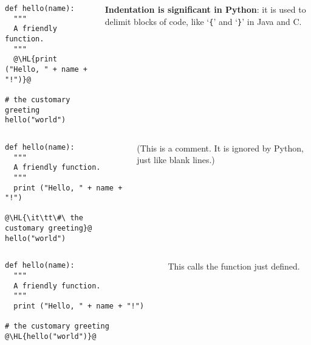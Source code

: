 \documentclass[english,serif,mathserif,xcolor=pdftex,dvipsnames,table]{beamer}
\begin{document}
\begin{frame}[fragile]
  \begin{columns}[t]
    \begin{column}{0.5\textwidth}
\begin{lstlisting}
def hello(name):
  """
  A friendly function.
  """
  @\HL{print ("Hello, " + name + "!")}@

# the customary greeting
hello("world")
\end{lstlisting}
    \end{column}
    \begin{column}{0.5\textwidth}
      \raggedleft 
      \textbf{Indentation is significant in Python}: it is used to delimit
      blocks of code, like `\texttt{\{}' and `\texttt{\}}' in Java and C.
    \end{column}
  \end{columns}
\end{frame}

\begin{frame}[fragile]
  \begin{columns}[t]
    \begin{column}{0.5\textwidth}
\begin{lstlisting}
def hello(name):
  """
  A friendly function.
  """
  print ("Hello, " + name + "!")

@\HL{\it\tt\#\ the customary greeting}@
hello("world")
\end{lstlisting}
    \end{column}
    \begin{column}{0.5\textwidth}
      \raggedleft 
      (This is a comment. It is ignored by Python, just like blank lines.)
    \end{column}
  \end{columns}
\end{frame}

\begin{frame}[fragile]
  \begin{columns}[t]
    \begin{column}{0.5\textwidth}
\begin{lstlisting}
def hello(name):
  """
  A friendly function.
  """
  print ("Hello, " + name + "!")

# the customary greeting
@\HL{hello("world")}@
\end{lstlisting}
    \end{column}
    \begin{column}{0.5\textwidth}
      \raggedleft 
      This calls the function just defined.
    \end{column}
  \end{columns}
\end{frame}
\end{document}
